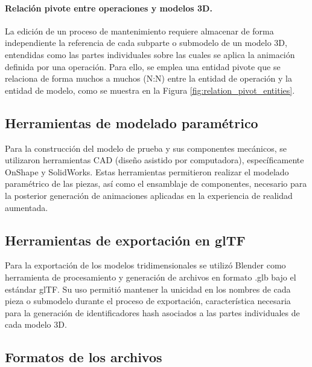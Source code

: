                 

            \paragraph{Relación pivote entre operaciones y modelos 3D.}
                
                La edición de un proceso de mantenimiento requiere almacenar de forma independiente la referencia de cada subparte o submodelo de un modelo 3D, entendidas como las partes individuales sobre las cuales se aplica la animación definida por una operación. Para ello, se emplea una entidad pivote que se relaciona de forma muchos a muchos (N:N) entre la entidad de operación y la entidad de modelo, como se muestra en la Figura \ref{fig:relation_pivot_entities}.

                

    \subsection{Herramientas de modelado paramétrico}

        Para la construcción del modelo de prueba y sus componentes mecánicos, se utilizaron herramientas CAD (diseño asistido por computadora), específicamente OnShape y SolidWorks. Estas herramientas permitieron realizar el modelado paramétrico de las piezas, así como el ensamblaje de componentes, necesario para la posterior generación de animaciones aplicadas en la experiencia de realidad aumentada.
    
    \subsection{Herramientas de exportación en glTF}

        Para la exportación de los modelos tridimensionales se utilizó Blender como herramienta de procesamiento y generación de archivos en formato .glb bajo el estándar glTF. Su uso permitió mantener la unicidad en los nombres de cada pieza o submodelo durante el proceso de exportación, característica necesaria para la generación de identificadores hash asociados a las partes individuales de cada modelo 3D.

    \subsection{Formatos de los archivos}

